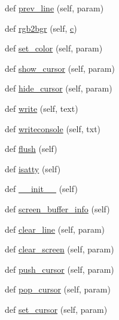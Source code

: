 \begin{DoxyCompactItemize}
\item 
def \hyperlink{classwaflib_1_1ansiterm_1_1_ansi_term_ac65f3453904e9c561f530b7c43e73f12}{prev\+\_\+line} (self, param)
\item 
def \hyperlink{classwaflib_1_1ansiterm_1_1_ansi_term_ad097d16ecb1babcef5970faccad1e7e9}{rgb2bgr} (self, \hyperlink{rfft2d_test_m_l_8m_ae0323a9039add2978bf5b49550572c7c}{c})
\item 
def \hyperlink{classwaflib_1_1ansiterm_1_1_ansi_term_a2b56ee3c8294f7e2e5bca7cc60e8ee05}{set\+\_\+color} (self, param)
\item 
def \hyperlink{classwaflib_1_1ansiterm_1_1_ansi_term_a594f6cf62d5e4ca33f2b88127fd6393d}{show\+\_\+cursor} (self, param)
\item 
def \hyperlink{classwaflib_1_1ansiterm_1_1_ansi_term_a2ca4bde33edd4afa92c8bda3f01d1dc9}{hide\+\_\+cursor} (self, param)
\item 
def \hyperlink{classwaflib_1_1ansiterm_1_1_ansi_term_a03ecdf1c9e54a69800aae320175c281b}{write} (self, text)
\item 
def \hyperlink{classwaflib_1_1ansiterm_1_1_ansi_term_a8296f875a3fd0a03fc109073f2a73a3e}{writeconsole} (self, txt)
\item 
def \hyperlink{classwaflib_1_1ansiterm_1_1_ansi_term_a08667242c11cdfd8b74d64f8191d4938}{flush} (self)
\item 
def \hyperlink{classwaflib_1_1ansiterm_1_1_ansi_term_a08e698612e76adc1aa3e26cdc5cb2009}{isatty} (self)
\item 
def \hyperlink{classwaflib_1_1ansiterm_1_1_ansi_term_ab397a7401f836bb9f96d9e54c6333821}{\+\_\+\+\_\+init\+\_\+\+\_\+} (self)
\item 
def \hyperlink{classwaflib_1_1ansiterm_1_1_ansi_term_afdb1bac8f2508bdf2279320b85286196}{screen\+\_\+buffer\+\_\+info} (self)
\item 
def \hyperlink{classwaflib_1_1ansiterm_1_1_ansi_term_ae9df276c42e0569ad63c20c19de62b93}{clear\+\_\+line} (self, param)
\item 
def \hyperlink{classwaflib_1_1ansiterm_1_1_ansi_term_aa94cc04f29c4c51e0013e5cb87c0fd07}{clear\+\_\+screen} (self, param)
\item 
def \hyperlink{classwaflib_1_1ansiterm_1_1_ansi_term_a9f489138508401c64c6927f215d8d6da}{push\+\_\+cursor} (self, param)
\item 
def \hyperlink{classwaflib_1_1ansiterm_1_1_ansi_term_a2093c2f7ded18188b0bf2989a0083a18}{pop\+\_\+cursor} (self, param)
\item 
def \hyperlink{classwaflib_1_1ansiterm_1_1_ansi_term_aba842837a7fe351aa8459aa375249c69}{set\+\_\+cursor} (self, param)

\end{DoxyCompactItemize}
